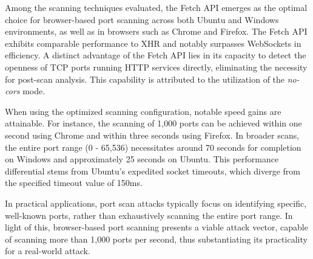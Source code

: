 Among the scanning techniques evaluated, the Fetch API emerges as the optimal choice for browser-based port scanning across both Ubuntu and Windows environments, as well as in browsers such as Chrome and Firefox. The Fetch API exhibits comparable performance to XHR and notably surpasses WebSockets in efficiency. A distinct advantage of the Fetch API lies in its capacity to detect the openness of TCP ports running HTTP services directly, eliminating the necessity for post-scan analysis. This capability is attributed to the utilization of the \emph{no-cors} mode.

When using the optimized scanning configuration, notable speed gains are attainable. For instance, the scanning of 1,000 ports can be achieved within one second using Chrome and within three seconds using Firefox. In broader scans, the entire port range (0 - 65,536) necessitates around 70 seconds for completion on Windows and approximately 25 seconds on Ubuntu. This performance differential stems from Ubuntu's expedited socket timeouts, which diverge from the specified timeout value of 150ms.

In practical applications, port scan attacks typically focus on identifying specific, well-known ports, rather than exhaustively scanning the entire port range. In light of this, browser-based port scanning presents a viable attack vector, capable of scanning more than 1,000 ports per second, thus substantiating its practicality for a real-world attack.









